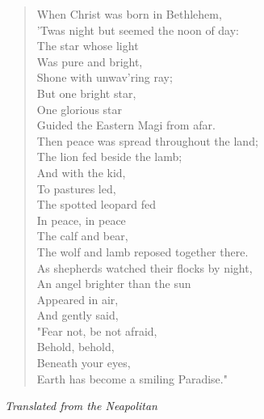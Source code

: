 
\begin{verse}
When Christ was born in Bethlehem,\\
'Twas night but seemed the noon of day:\\
\hspace*{2em}The star whose light\\
\hspace*{2em}Was pure and bright,\\
Shone with unwav'ring ray;\\
\hspace*{2em}But one bright star,\\
\hspace*{2em}One glorious star\\
Guided the Eastern Magi from afar.\\[0.7em]

Then peace was spread throughout the land;\\
The lion fed beside the lamb;\\
\hspace*{2em}And with the kid,\\
\hspace*{2em}To pastures led,\\
The spotted leopard fed\\
\hspace*{2em}In peace, in peace\\
\hspace*{2em}The calf and bear,\\
The wolf and lamb reposed together there.\\[0.7em]

As shepherds watched their flocks by night,\\
An angel brighter than the sun\\
\hspace*{2em}Appeared in air,\\
\hspace*{2em}And gently said,\\
"Fear not, be not afraid,\\
\hspace*{2em}Behold, behold,\\
\hspace*{2em}Beneath your eyes,\\
Earth has become a smiling Paradise."%
\end{verse}

\vspace{0.5\baselineskip}
\noindent\textit{Translated from the Neapolitan}

\newpage
